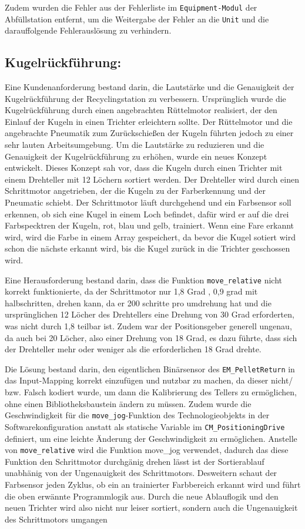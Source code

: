 Zudem wurden die Fehler aus der Fehlerliste im \texttt{Equipment-Modul} der Abfüllstation entfernt, um die Weitergabe der Fehler an die \texttt{Unit} und die darauffolgende Fehlerauslösung zu verhindern.  

\subsection{Kugelrückführung:}
Eine Kundenanforderung bestand darin, die Lautstärke und die Genauigkeit der Kugelrückführung der Recyclingstation zu verbessern. Ursprünglich wurde die Kugelrückführung durch einen angebrachten Rüttelmotor realisiert, der den Einlauf der Kugeln in einen Trichter erleichtern sollte. Der Rüttelmotor und die angebrachte Pneumatik zum Zurückschießen der Kugeln führten jedoch zu einer sehr lauten Arbeitsumgebung. Um die Lautstärke zu reduzieren und die Genauigkeit der Kugelrückführung zu erhöhen, wurde ein neues Konzept entwickelt. Dieses Konzept sah vor, dass die Kugeln durch einen Trichter mit einem Drehteller mit 12 Löchern sortiert werden. Der Drehteller wird durch einen Schrittmotor angetrieben, der die Kugeln zu der Farberkennung und der Pneumatic schiebt. Der Schrittmotor läuft durchgehend und ein Farbsensor soll erkennen, ob sich eine Kugel in einem Loch befindet, dafür wird er auf die drei Farbspecktren der Kugeln, rot, blau und gelb, trainiert. Wenn eine Fare erkannt wird, wird die Farbe in einem Array gespeichert, da bevor die Kugel sotiert wird schon die nächste erkannt wird, bis die Kugel zurück in die Trichter geschossen wird.

Eine Herausforderung bestand darin, dass die Funktion \texttt{move\_relative} nicht korrekt funktionierte, da der Schrittmotor nur 1,8 Grad , 0,9 grad mit halbschritten, drehen kann, da er 200 schritte pro umdrehung hat und die ursprünglichen 12 Löcher des Drehtellers eine Drehung von 30 Grad erforderten, was nicht durch 1,8 teilbar ist. Zudem war der Positionsgeber generell ungenau, da auch bei 20 Löcher, also einer Drehung von 18 Grad, es dazu führte, dass sich der Drehteller mehr oder weniger als die erforderlichen 18 Grad drehte.

Die Lösung bestand darin, den eigentlichen Binärsensor des \texttt{EM\_PelletReturn} in das Input-Mapping korrekt einzufügen und nutzbar zu machen, da dieser nicht/ bzw. Falsch kodiert wurde, um dann die Kalibrierung des Tellers zu ermöglichen, ohne einen Bibliotheksbaustein ändern zu müssen. Zudem wurde die Geschwindigkeit für die \texttt{move\_jog}-Funktion des Technologieobjekts in der Softwarekonfiguration anstatt als statische Variable im \texttt{CM\_PositioningDrive} definiert, um eine leichte Änderung der Geschwindigkeit zu ermöglichen. Anstelle von \texttt{move\_relative} wird die Funktion move_jog verwendet, dadurch das diese Funktion den Schrittmotor durchgänig drehen lässt ist der Sortierablauf unabhänig von der Ungenauigkeit des Schrittmotors. Desweitern schaut der Farbsensor jeden Zyklus, ob ein an trainierter Farbbereich erkannt wird und führt die oben erwännte Programmlogik aus. Durch die neue Ablauflogik und den neuen Trichter wird also nicht nur leiser sortiert, sondern auch die Ungenauigkeit des Schrittmotors umgangen

